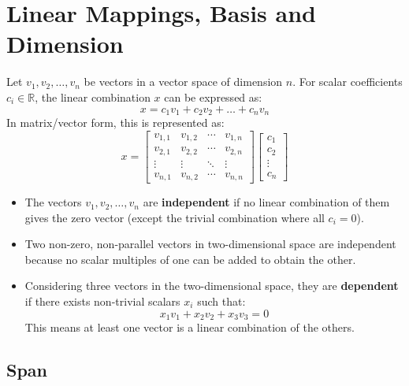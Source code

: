\section{Linear Mappings, Basis and Dimension}

Let \( v_1, v_2, \ldots, v_n \) be vectors in a vector space of dimension \( n \). For scalar coefficients \( c_i \in \mathbb{R} \), the linear combination \( x \) can be expressed as:
    \[ x = c_1v_1 + c_2v_2 + \ldots + c_nv_n \]
    In matrix/vector form, this is represented as:
    \[
    x = \begin{bmatrix}
    v_{1,1} & v_{1,2} & \cdots & v_{1,n} \\
    v_{2,1} & v_{2,2} & \cdots & v_{2,n} \\
    \vdots & \vdots & \ddots & \vdots \\
    v_{n,1} & v_{n,2} & \cdots & v_{n,n}
    \end{bmatrix}
    \begin{bmatrix}
    c_1 \\
    c_2 \\
    \vdots \\
    c_n
    \end{bmatrix}
    \]

\begin{itemize}
    \item The vectors \( v_1, v_2, \ldots, v_n \) are \textbf{independent} if no linear combination of them gives the zero vector (except the trivial combination where all \( c_i = 0 \)).

    \item Two non-zero, non-parallel vectors in two-dimensional space are independent because no scalar multiples of one can be added to obtain the other.

    \item Considering three vectors in the two-dimensional space, they are \textbf{dependent} if there exists non-trivial scalars \( x_i \) such that:
    \[ x_1v_1 + x_2v_2 + x_3v_3 = 0 \]
    This means at least one vector is a linear combination of the others.
\end{itemize}

\subsection{Span}


